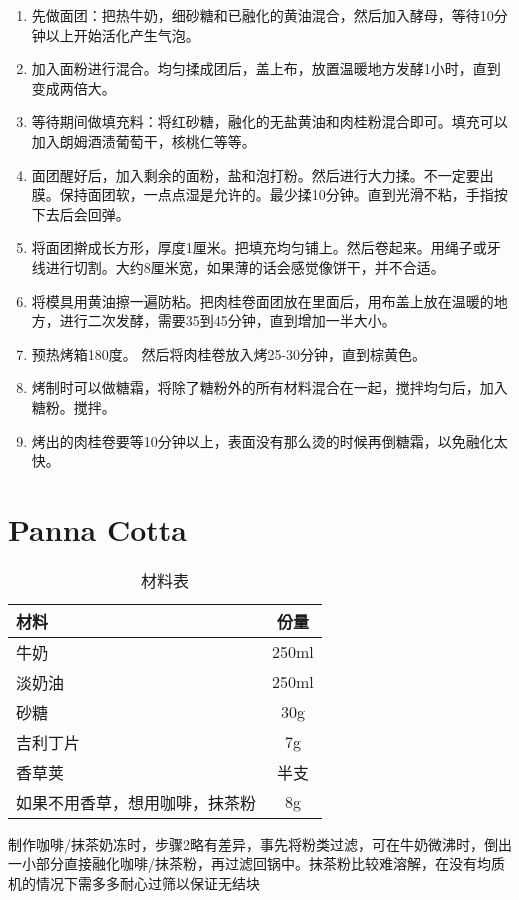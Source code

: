 \begin{enumerate}
    \item 先做面团：把热牛奶，细砂糖和已融化的黄油混合，然后加入酵母，等待10分钟以上开始活化产生气泡。
    \item 加入面粉进行混合。均匀揉成团后，盖上布，放置温暖地方发酵1小时，直到变成两倍大。
    \item 等待期间做填充料：将红砂糖，融化的无盐黄油和肉桂粉混合即可。填充可以加入朗姆酒渍葡萄干，核桃仁等等。
    \item 面团醒好后，加入剩余的面粉，盐和泡打粉。然后进行大力揉。不一定要出膜。保持面团软，一点点湿是允许的。最少揉10分钟。直到光滑不粘，手指按下去后会回弹。
    \item 将面团擀成长方形，厚度1厘米。把填充均匀铺上。然后卷起来。用绳子或牙线进行切割。大约8厘米宽，如果薄的话会感觉像饼干，并不合适。
    \item 将模具用黄油擦一遍防粘。把肉桂卷面团放在里面后，用布盖上放在温暖的地方，进行二次发酵，需要35到45分钟，直到增加一半大小。
    \item 预热烤箱180度。 然后将肉桂卷放入烤25-30分钟，直到棕黄色。
    \item 烤制时可以做糖霜，将除了糖粉外的所有材料混合在一起，搅拌均匀后，加入糖粉。搅拌。
    \item 烤出的肉桂卷要等10分钟以上，表面没有那么烫的时候再倒糖霜，以免融化太快。
\end{enumerate}

\section{Panna Cotta}

\begin{table}[h]
    \centering
    \begin{tabular}{|l||c|}\hline
     \textbf{材料}    &  \textbf{份量}\\ \hline\hline
    牛奶     &  250ml \\ \hline
    淡奶油     &  250ml \\ \hline
    砂糖     &  30g \\ \hline
    吉利丁片  & 7g  \\ \hline
    香草荚 &  半支  \\ \hline
    如果不用香草，想用咖啡，抹茶粉 &  8g  \\ \hline
    \end{tabular}
    \caption{材料表}
\end{table}

制作咖啡/抹茶奶冻时，步骤2略有差异，事先将粉类过滤，可在牛奶微沸时，倒出一小部分直接融化咖啡/抹茶粉，再过滤回锅中。抹茶粉比较难溶解，在没有均质机的情况下需多多耐心过筛以保证无结块

